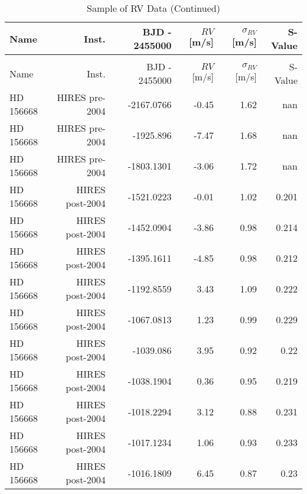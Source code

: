 \begin{longtable*}{lrrrrr}
\caption{Sample of RV Data} \\
\toprule 
\midrule 

Name & Inst. & BJD - 2455000 & $RV$ [m/s] & $\sigma_{RV}$ [m/s] & S-Value \\ 
\toprule 
\endfirsthead 
\caption[]{Sample of RV Data (Continued)} \\
\toprule 
\midrule 
Name & Inst. & BJD - 2455000 & $RV$ [m/s] & $\sigma_{RV}$ [m/s] & S-Value \\ 
\toprule 
\endhead 
HD 156668 & HIRES pre-2004 & -2167.0766 & -0.45 & 1.62 & nan \\ 
HD 156668 & HIRES pre-2004 & -1925.896 & -7.47 & 1.68 & nan \\ 
HD 156668 & HIRES pre-2004 & -1803.1301 & -3.06 & 1.72 & nan \\ 
HD 156668 & HIRES post-2004  & -1521.0223 & -0.01 & 1.02 & 0.201 \\ 
HD 156668 & HIRES post-2004  & -1452.0904 & -3.86 & 0.98 & 0.214 \\ 
HD 156668 & HIRES post-2004  & -1395.1611 & -4.85 & 0.98 & 0.212 \\ 
HD 156668 & HIRES post-2004  & -1192.8559 & 3.43 & 1.09 & 0.222 \\ 
HD 156668 & HIRES post-2004  & -1067.0813 & 1.23 & 0.99 & 0.229 \\ 
HD 156668 & HIRES post-2004  & -1039.086 & 3.95 & 0.92 & 0.22 \\ 
HD 156668 & HIRES post-2004  & -1038.1904 & 0.36 & 0.95 & 0.219 \\ 
HD 156668 & HIRES post-2004  & -1018.2294 & 3.12 & 0.88 & 0.231 \\ 
HD 156668 & HIRES post-2004  & -1017.1234 & 1.06 & 0.93 & 0.233 \\ 
HD 156668 & HIRES post-2004  & -1016.1809 & 6.45 & 0.87 & 0.23 \\ 
\bottomrule 
\end{longtable*} 
